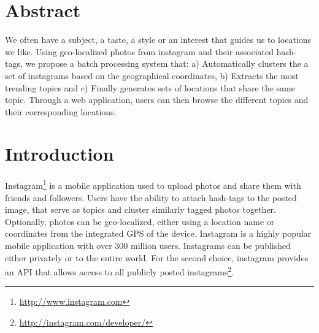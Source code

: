 %
%

% 



\newpage
\tableofcontents
\newpage
\section{Abstract}
We often have a subject, a taste, a style or an interest that guides us to locations we like.  Using geo-localized photos from instagram and their associated hash-tags, we propose a batch processing system that: a) Automatically clusters the a set of instagrams based on the geographical coordinates, b) Extracts the most trending topics and c) Finally generates sets of locations that share the same topic. Through a web application, users can then browse the different topics and their corresponding locations.

\section{Introduction}
Instagram\footnote{\url{http://www.instagram.com}} is a mobile application used to upload photos and share them with friends and followers. Users have the ability to attach hash-tags to the posted image, that serve as topics and cluster similarly tagged photos together. Optionally, photos can be geo-localized, either using a location name or coordinates from the integrated GPS of the device. Instagram is a highly popular mobile application with over $300$ million users. Instagrams can be published either privately or to the entire world. For the second choice, instagram provides an API that allows access to all publicly posted instagrams\footnote{\url{http://instagram.com/developer/}}.

